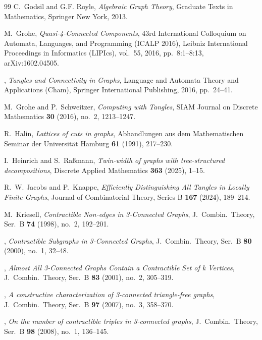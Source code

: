 \documentclass{aic}
\theoremstyle{plain}
\theoremstyle{definition}
\theoremstyle{plain}
\theoremstyle{plain}
\begin{document}
\begin{thebibliography}{99}
C.~Godsil and G.F. Royle, \emph{Algebraic {G}raph {T}heory}, Graduate Texts in
  Mathematics, Springer New York, 2013.

M.~Grohe, \emph{Quasi-4-{C}onnected {C}omponents}, 43rd International
  Colloquium on Automata, Languages, and Programming (ICALP 2016), Leibniz
  International Proceedings in Informatics (LIPIcs), vol.~55, 2016,
  pp.~8:1--8:13, arXiv:1602.04505.

\bysame, \emph{Tangles and {C}onnectivity in {G}raphs}, Language and Automata
  Theory and Applications (Cham), Springer International Publishing, 2016,
  pp.~24--41.

M.~Grohe and P.~Schweitzer, \emph{Computing with {T}angles}, SIAM Journal on
  Discrete Mathematics \textbf{30} (2016), no.~2, 1213--1247.

R.~Halin, \emph{Lattices of cuts in graphs}, Abhandlungen aus dem
  Mathematischen Seminar der Universität Hamburg \textbf{61} (1991), 217--230.

I.~Heinrich and S.~Raßmann, \emph{Twin-width of graphs with tree-structured
  decompositions}, Discrete Applied Mathematics \textbf{363} (2025), 1--15.

R.~W. Jacobs and P.~Knappe, \emph{Efficiently {D}istinguishing {A}ll {T}angles
  in {L}ocally {F}inite {G}raphs}, Journal of Combinatorial Theory, Series B
  \textbf{167} (2024), 189--214.

M.~Kriesell, \emph{Contractible {N}on-edges in 3-{C}onnected {G}raphs},
  J.~Combin.\ Theory, Ser.~B \textbf{74} (1998), no.~2, 192--201.

\bysame, \emph{Contractible {S}ubgraphs in 3-{C}onnected {G}raphs}, J.~Combin.\
  Theory, Ser.~B \textbf{80} (2000), no.~1, 32--48.

\bysame, \emph{Almost {A}ll 3-{C}onnected {G}raphs {C}ontain a {C}ontractible
  {S}et of k {V}ertices}, J.~Combin.\ Theory, Ser.~B \textbf{83} (2001), no.~2,
  305--319.

\bysame, \emph{A constructive characterization of 3-connected triangle-free
  graphs}, J.~Combin.\ Theory, Ser.~B \textbf{97} (2007), no.~3, 358--370.

\bysame, \emph{On the number of contractible triples in 3-connected graphs},
  J.~Combin.\ Theory, Ser.~B \textbf{98} (2008), no.~1, 136--145.


\end{thebibliography}
\end{document}
